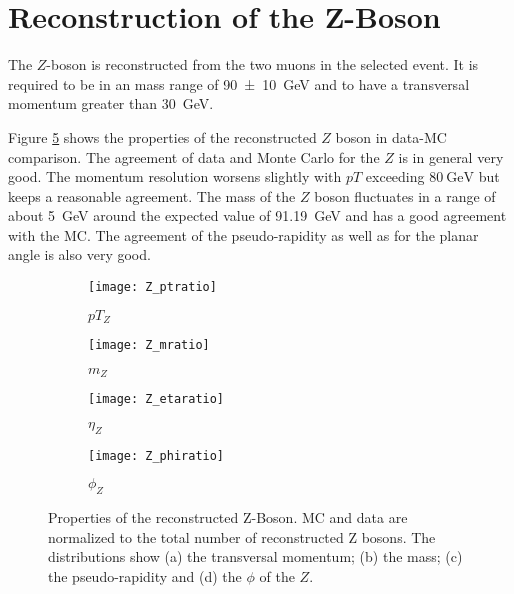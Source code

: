 \section{Reconstruction of the Z-Boson}

The $Z$-boson is reconstructed from the two muons in the selected event.
It is required to be in an mass range of \SI{90+-10}{\GeV} and to have a transversal momentum greater than \SI{30}{\GeV}.

Figure \ref{fig:z} shows the properties of the reconstructed $Z$ boson in data-MC comparison. The agreement of data and Monte Carlo for the $Z$ is in general very good. The momentum resolution worsens slightly with $pT$ exceeding $\SI{80}{\GeV}$ but keeps a reasonable agreement. The mass of the $Z$ boson fluctuates in a range of about \SI{5}{\GeV} around the expected value of \SI{91.19}{\GeV} and has a good agreement with the MC.
The agreement of the pseudo-rapidity as well as for the planar angle is also very good.


\begin{figure}[h]
\centering
\begin{subfigure}[b]{0.5\figwidth}
\texttt{[image: Z\_ptratio]}
\caption[Transversal momentum of the reconstructed Z]{$pT_Z$}
\label{fig:zpt}
\end{subfigure}
\quad
\begin{subfigure}[b]{0.5\figwidth}
\texttt{[image: Z\_mratio]}
\caption[mass of the reconstructed $Z$]{$m_Z$}
\label{fig:zm}
\end{subfigure}


\begin{subfigure}[b]{0.5\figwidth}
\texttt{[image: Z\_etaratio]}
\caption[$\eta$ of the reconstructed $Z$]{$\eta_Z$}
\label{fig:zeta}
\end{subfigure}
\quad
\begin{subfigure}[b]{0.5\figwidth}
\texttt{[image: Z\_phiratio]}
\caption[$\phi$ of the reconstructed $Z$]{$\phi_Z$}
\label{fig:zphi}
\end{subfigure}
\caption{Properties of the reconstructed Z-Boson. MC and data are normalized to the total number of reconstructed Z bosons. The distributions show (a) the transversal momentum; (b) the mass; (c) the pseudo-rapidity and (d) the $\phi$ of the $Z$.}
\label{fig:z}
\end{figure}

